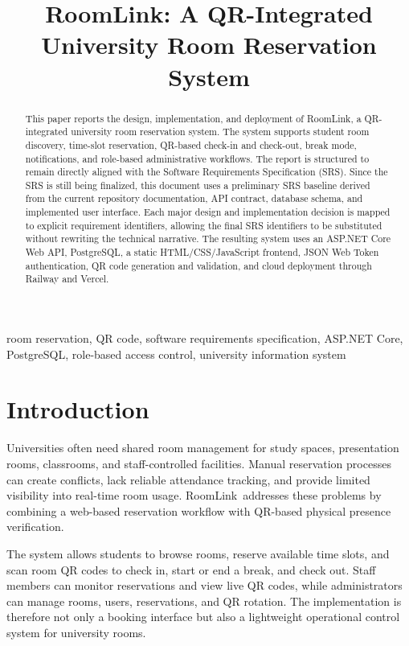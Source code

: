 \documentclass[conference]{IEEEtran}
\title{RoomLink: A QR-Integrated University Room Reservation System}
\author{
\IEEEauthorblockN{Ibrahim Utlu}
\IEEEauthorblockA{
Department of Computer Engineering\\
Istanbul Medipol University\\
Istanbul, Turkey}
}
\newcommand{\RoomLink}{RoomLink}
\begin{document}
\maketitle

\begin{abstract}
This paper reports the design, implementation, and deployment of \RoomLink, a
QR-integrated university room reservation system. The system supports student
room discovery, time-slot reservation, QR-based check-in and check-out, break
mode, notifications, and role-based administrative workflows. The report is
structured to remain directly aligned with the Software Requirements
Specification (SRS). Since the SRS is still being finalized, this document uses
a preliminary SRS baseline derived from the current repository documentation,
API contract, database schema, and implemented user interface. Each major
design and implementation decision is mapped to explicit requirement
identifiers, allowing the final SRS identifiers to be substituted without
rewriting the technical narrative. The resulting system uses an ASP.NET Core
Web API, PostgreSQL, a static HTML/CSS/JavaScript frontend, JSON Web Token
authentication, QR code generation and validation, and cloud deployment through
Railway and Vercel.
\end{abstract}

\begin{IEEEkeywords}
room reservation, QR code, software requirements specification, ASP.NET Core,
PostgreSQL, role-based access control, university information system
\end{IEEEkeywords}

\section{Introduction}
Universities often need shared room management for study spaces, presentation
rooms, classrooms, and staff-controlled facilities. Manual reservation
processes can create conflicts, lack reliable attendance tracking, and provide
limited visibility into real-time room usage. \RoomLink\ addresses these
problems by combining a web-based reservation workflow with QR-based physical
presence verification.

The system allows students to browse rooms, reserve available time slots, and
scan room QR codes to check in, start or end a break, and check out. Staff
members can monitor reservations and view live QR codes, while administrators
can manage rooms, users, reservations, and QR rotation. The implementation is
therefore not only a booking interface but also a lightweight operational
control system for university rooms.
\end{document}
